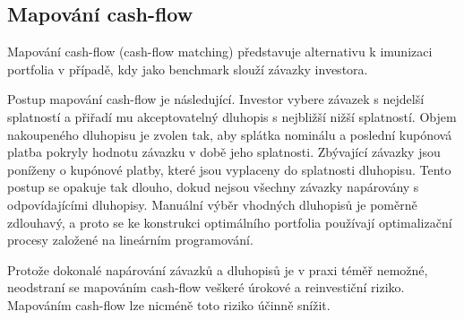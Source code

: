 \documentclass[a4paper]{book}
\begin{document}
\subsection{Mapování cash-flow}

Mapování cash-flow (cash-flow matching) představuje alternativu k imunizaci portfolia v případě, kdy jako benchmark slouží závazky investora.

Postup mapování cash-flow je následující. Investor vybere závazek s nejdelší splatností a přiřadí mu akceptovatelný dluhopis s nejbližší nižší splatností. Objem nakoupeného dluhopisu je zvolen tak, aby splátka nominálu a poslední kupónová platba pokryly hodnotu závazku v době jeho splatnosti. Zbývající závazky jsou poníženy o kupónové platby, které jsou vyplaceny do splatnosti dluhopisu. Tento postup se opakuje tak dlouho, dokud nejsou všechny závazky napárovány s odpovídajícími dluhopisy. Manuální výběr vhodných dluhopisů je poměrně zdlouhavý, a proto se ke konstrukci optimálního portfolia používají optimalizační procesy založené na lineárním programování.

Protože dokonalé napárování závazků a dluhopisů je v praxi téměř nemožné, neodstraní se mapováním cash-flow veškeré úrokové a reinvestiční riziko. Mapováním cash-flow lze nicméně toto riziko účinně snížit. 
\end{document}

